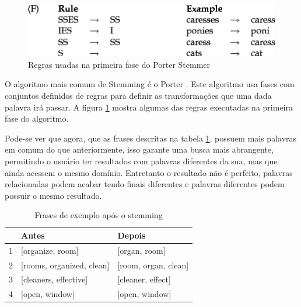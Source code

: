 \begin{figure}[htb]
	\centering
	\includegraphics[width=\textwidth]{chapters/project/porterrules.png}
	\caption{Regras usadas na primeira fase do Porter Stemmer}
    \label{fig:porterstemmerprocess}
\end{figure}

O algoritmo mais comum de Stemming é o Porter \cite{porterstemming}. Este algoritmo usa fases com conjuntos definidos de regras para definir as transformações que uma dada palavra irá passar. A figura \ref{fig:porterstemmerprocess} mostra algumas das regras executadas na primeira fase do algoritmo.

Pode-se ver que agora, que as frases descritas na tabela \ref{tab:tokenfilter}, possuem mais palavras em comum do que anteriormente, isso garante uma busca mais abrangente, permitindo o usuário ter resultados com palavras diferentes da sua, mas que ainda acessem o mesmo domínio. Entretanto o resultado não é perfeito, palavras relacionadas podem acabar tendo finais diferentes e palavras diferentes podem possuir o mesmo resultado.
\begin{table}[htb]
	\centering
    \def\arraystretch{1.2}
    \begin{tabular}{|l|l|l|}
        \hline
        & \textbf{Antes} & \textbf{Depois} \\ \hline
        1 & [organize, room]  & [organ, room]            \\ \hline
        2 & [rooms, organized, clean]  & [room, organ, clean] \\ \hline
        3 & [cleaners, effective]  & [cleaner, effect]                              \\ \hline
        4 & [open, window]  & [open, window]                             \\ \hline
    \end{tabular}
	\caption{Frases de exemplo após o stemming}
    \label{tab:tokenfilter}
\end{table}

